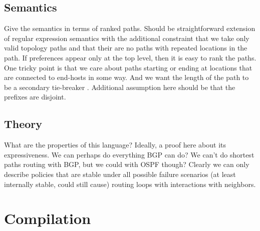 \documentclass{sigplanconf}
\begin{document}
\subsection{Semantics} 
Give the semantics in terms of ranked paths.
Should be straightforward extension of regular expression semantics with the 
additional constraint that we take only valid topology paths and that their are no paths with 
repeated locations in the path. If preferences appear only at the top level, then it is easy to rank the paths.
One tricky point is that we care about paths starting or ending at locations that are connected to end-hosts in some way.
And we want the length of the path to be a secondary tie-breaker .
Additional assumption here should be that the prefixes are disjoint.

\subsection{Theory}
What are the properties of this language? Ideally, a proof here about its expressiveness. We can perhaps do everything 
BGP can do? We can't do shortest paths routing with BGP, but we could with OSPF though? Clearly we can only describe 
policies that are stable under all possible failure scenarios (at least internally stable, could still cause) routing 
loops with interactions with neighbors.


\section{Compilation}
\end{document}
